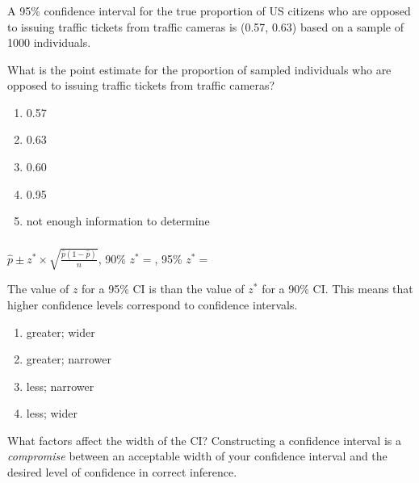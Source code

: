 \begin{frame}
\frametitle{\grp}
A 95\% confidence interval for the true proportion of US citizens who are opposed to issuing traffic tickets from traffic cameras is (0.57, 0.63) based on a sample of 1000 individuals.
\begin{clicker}
{What is the point estimate for the proportion of sampled individuals who are opposed to issuing traffic tickets from traffic cameras?}
\begin{enumerate}
    \item
    0.57
    \item
    0.63
    \item
    0.60
    \item
    0.95
    \item
    not enough information to determine
\end{enumerate}
\end{clicker}
\end{frame}





\begin{frame}
\frametitle{\grp}
\begin{center}
$\hat{p} \pm z^{*} \times \sqrt{\frac{\hat{p}(1-\hat{p})}{n}}$, 90\% $z^{*} = $\underline{\hspace{0.5in}},  95\% $z^{*} = $\underline{\hspace{0.5in}}
\end{center}
\begin{clicker}{The value of $z$ for a  95\% CI is \underline{\hspace{1in}} than the value of $z^{*}$ for a 90\% CI.  This means that higher confidence levels correspond to \underline{\hspace{1in}} confidence intervals.}
\begin{enumerate}
    \item
    greater; wider
    \item
    greater; narrower
    \item
    less; narrower
    \item
    less; wider
\end{enumerate}
\end{clicker}
\vskip10pt
What factors affect the width of the CI?
Constructing a confidence interval is a \emph{compromise} between an acceptable width of your confidence interval and the desired level of confidence in correct inference.
\end{frame}


